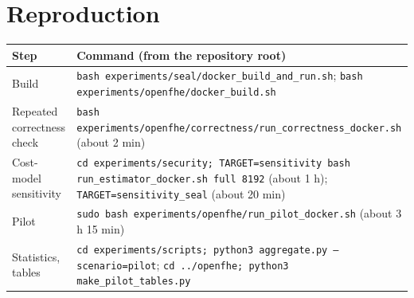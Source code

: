 \documentclass[11pt]{article}
\begin{document}
\section{Reproduction}
\label{sec:repro}

{\footnotesize
\begin{tabular}{@{}L{5.0cm}L{11.5cm}@{}}
\toprule
Step & Command (from the repository root) \\
\midrule
Build & \texttt{bash experiments/seal/docker\_build\_and\_run.sh}; \texttt{bash experiments/openfhe/docker\_build.sh} \\
Repeated correctness check & \texttt{bash experiments/openfhe/correctness/run\_correctness\_docker.sh} (about 2 min) \\
Cost-model sensitivity & \texttt{cd experiments/security; TARGET=sensitivity bash run\_estimator\_docker.sh full 8192} (about 1 h); \texttt{TARGET=sensitivity\_seal} (about 20 min) \\
Pilot & \texttt{sudo bash experiments/openfhe/run\_pilot\_docker.sh} (about 3 h 15 min) \\
Statistics, tables & \texttt{cd experiments/scripts; python3 aggregate.py --scenario=pilot}; \texttt{cd ../openfhe; python3 make\_pilot\_tables.py} \\
\bottomrule
\end{tabular}}
\end{document}
